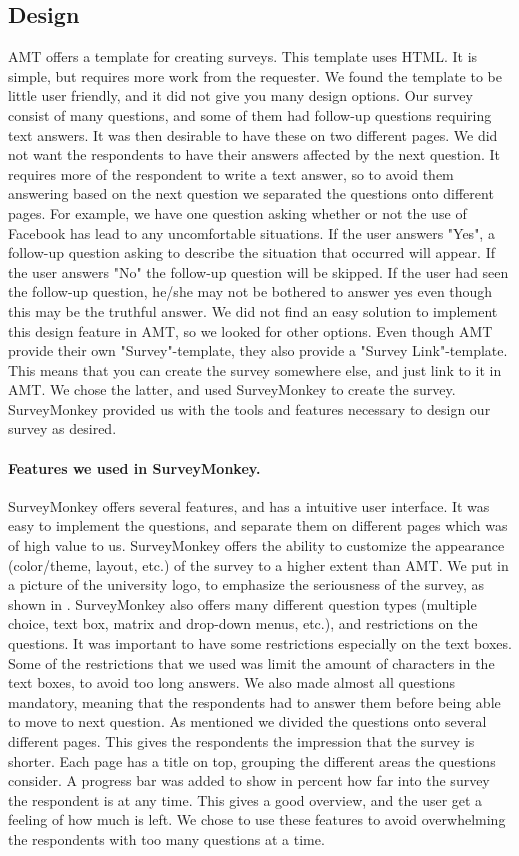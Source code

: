 \subsection{Design}
AMT offers a template for creating surveys. This template uses HTML. It is simple, but requires more work from the requester. We found the template to be little user friendly, and it did not give you many design options. Our survey consist of many questions, and some of them had follow-up questions requiring text answers. It was then desirable to have these on two different pages. We did not want the respondents to have their answers affected by the next question. It requires more of the respondent to write a text answer, so to avoid them answering based on the next question we separated the questions onto different pages. For example, we have one question asking whether or not the use of Facebook has lead to any uncomfortable situations. If the user answers "Yes", a follow-up question asking to describe the situation that occurred will appear. If the user answers "No" the follow-up question will be skipped. If the user had seen the follow-up question, he/she may not be bothered to answer yes even though this may be the truthful answer. We did not find an easy solution to implement this design feature in AMT, so we looked for other options. Even though AMT provide their own "Survey"-template, they also provide a "Survey Link"-template. This means that you can create the survey somewhere else, and just link to it in AMT. We chose the latter, and used SurveyMonkey to create the survey. SurveyMonkey provided us with the tools and features necessary to design our survey as desired. 

\paragraph{Features we used in SurveyMonkey.}
SurveyMonkey offers several features, and has a intuitive user interface. It was easy to implement the questions, and separate them on different pages which was of high value to us. SurveyMonkey offers the ability to customize the appearance (color/theme, layout, etc.) of the survey to a higher extent than AMT. We put in a picture of the university logo, to emphasize the seriousness of the survey, as shown in . SurveyMonkey also offers many different question types (multiple choice, text box, matrix and drop-down menus, etc.), and restrictions on the questions. It was important to have some restrictions especially on the text boxes. Some of the restrictions that we used was limit the amount of characters in the text boxes, to avoid too long answers. We also made almost all questions mandatory, meaning that the respondents had to answer them before being able to move to next question. As mentioned we divided the questions onto several different pages. This gives the respondents the impression that the survey is shorter. Each page has a title on top, grouping the different areas the questions consider. A progress bar was added to show in percent how far into the survey the respondent is at any time. This gives a good overview, and the user get a feeling of how much is left. We chose to use these features to avoid overwhelming the respondents with too many questions at a time. 

